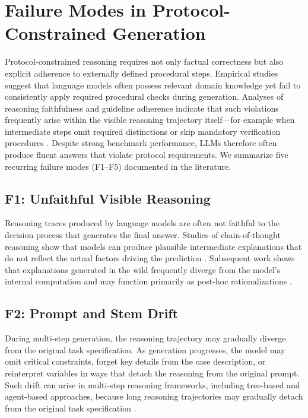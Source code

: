 \documentclass[twocolumn]{article}
\begin{document}
\section{Failure Modes in Protocol-Constrained
Generation}\label{sec:failure_modes}

Protocol-constrained reasoning requires not only factual correctness but also
explicit adherence to externally defined procedural steps. Empirical studies
suggest that language models often possess relevant domain knowledge yet fail to
consistently apply required procedural checks during generation. Analyses of
reasoning faithfulness and guideline adherence indicate that such violations
frequently arise within the visible reasoning trajectory itself---for example
when intermediate steps omit required distinctions or skip mandatory
verification procedures
\parencite{lanham2023measuringfaithfulnesscot,arcuschin2025cotwild,
fast2024amega}. Despite strong benchmark performance, LLMs therefore often
produce fluent answers that violate protocol requirements. We summarize five
recurring failure modes (F1--F5) documented in the literature.

\subsection*{F1: Unfaithful Visible
Reasoning}\label{sec:f1_unfaithful_reasoning}

Reasoning traces produced by language models are often not faithful to the
decision process that generates the final answer. Studies of chain-of-thought
reasoning show that models can produce plausible intermediate explanations that
do not reflect the actual factors driving the prediction
\parencite{lanham2023measuringfaithfulnesscot,lyu2023faithfulcot}. Subsequent
work shows that explanations generated in the wild frequently diverge from the
model's internal computation and may function primarily as post-hoc
rationalizations \parencite{arcuschin2025cotwild}.

\subsection*{F2: Prompt and Stem Drift}\label{sec:f2_prompt_stem_drift}

During multi-step generation, the reasoning trajectory may gradually diverge
from the original task specification. As generation progresses, the model may
omit critical constraints, forget key details from the case description, or
reinterpret variables in ways that detach the reasoning from the original
prompt. Such drift can arise in multi-step reasoning frameworks, including
tree-based and agent-based approaches, because long reasoning trajectories may
gradually detach from the original task specification
\parencite{yao2023treeofthoughts,yao2023react}.
\end{document}
